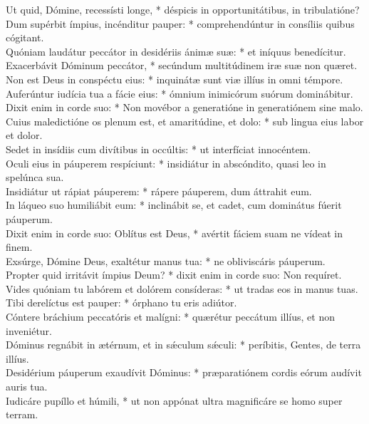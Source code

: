 {	Ut quid, Dómine, recessísti longe, * déspicis in opportunitátibus, in tribulatióne? \\
	Dum supérbit ímpius, incénditur pauper: * comprehendúntur in consíliis quibus cógitant. \\
	Quóniam laudátur peccátor in desidériis ánimæ suæ: * et iníquus benedícitur. \\
	Exacerbávit Dóminum peccátor, * secúndum multitúdinem iræ suæ non quæret. \\
	Non est Deus in conspéctu eius: * inquinátæ sunt viæ illíus in omni témpore. \\
	Auferúntur iudícia tua a fácie eius: * ómnium inimicórum suórum dominábitur. \\
	Dixit enim in corde suo: * Non movébor a generatióne in generatiónem sine malo. \\
	Cuius maledictióne os plenum est, et amaritúdine, et dolo: * sub lingua eius labor et dolor. \\
	Sedet in insídiis cum divítibus in occúltis: * ut interfíciat innocéntem. \\
	Oculi eius in páuperem respíciunt: * insidiátur in abscóndito, quasi leo in spelúnca sua. \\
	Insidiátur ut rápiat páuperem: * rápere páuperem, dum áttrahit eum. \\
	In láqueo suo humiliábit eum: * inclinábit se, et cadet, cum dominátus fúerit páuperum. \\
	Dixit enim in corde suo: Oblítus est Deus, * avértit fáciem suam ne vídeat in finem. \\
	Exsúrge, Dómine Deus, exaltétur manus tua: * ne obliviscáris páuperum. \\
	Propter quid irritávit ímpius Deum? * dixit enim in corde suo: Non requíret. \\
	Vides quóniam tu labórem et dolórem consíderas: * ut tradas eos in manus tuas. \\
	Tibi derelíctus est pauper: * órphano tu eris adiútor. \\
	Cóntere bráchium peccatóris et malígni: * quærétur peccátum illíus, et non inveniétur. \\
	Dóminus regnábit in ætérnum, et in sǽculum sǽculi: * períbitis, Gentes, de terra illíus. \\
	Desidérium páuperum exaudívit Dóminus: * præparatiónem cordis eórum audívit auris tua. \\
	Iudicáre pupíllo et húmili, * ut non appónat ultra magnificáre se homo super terram. \\
}

